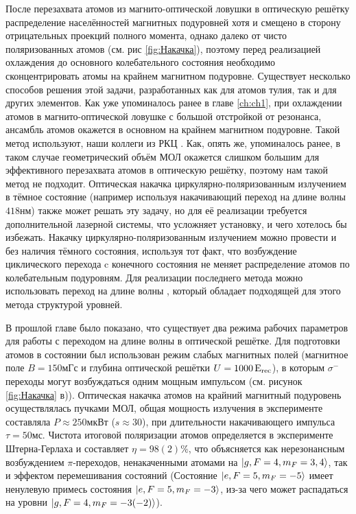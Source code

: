 После перезахвата атомов из магнито-оптической ловушки в оптическую решётку распределение населённостей магнитных подуровней хотя и смещено в сторону отрицательных проекций полного момента, однако далеко от чисто поляризованных атомов (см. рис \ref{fig:Накачка}), поэтому перед реализацией охлаждения до основного колебательного состояния необходимо сконцентрировать атомы на крайнем магнитном подуровне. 
Существует несколько способов решения этой задачи, разработанных как для атомов тулия, так и для других элементов. 
Как уже упоминалось ранее в главе \ref{ch:ch1}, при охлаждении атомов в магнито-оптической ловушке с большой отстройкой от резонанса, ансамбль атомов окажется в основном на крайнем магнитном подуровне.  
Такой метод используют, наши коллеги из РКЦ \cite{tsyganok2018polarized}. 
Как, опять же, упоминалось ранее, в таком случае геометрический объём МОЛ окажется слишком большим для эффективного перезахвата атомов в оптическую решётку, поэтому нам такой метод не подходит.
Оптическая накачка циркулярно-поляризованным излучением в тёмное состояние (например используя накачивающий переход на длине волны $418\unit{нм}$) также может решать эту задачу, но для её реализации требуется дополнительной лазерной системы, что усложняет установку, и чего хотелось бы избежать.
Накачку циркулярно-поляризованным излучением можно провести и без наличия тёмного состояния, используя тот факт, что возбуждение циклического перехода c конечного состояния не меняет распределение атомов по колебательным подуровням.
Для реализации последнего метода можно использовать переход на длине волны \thd, который обладает подходящей для этого метода структурой уровней.

В прошлой главе было показано, что существует два режима рабочих параметров для работы с переходом на длине волны \thd в оптической решётке. 
Для подготовки атомов в состоянии  был использован режим слабых магнитных полей (магнитное поле $B = 150\unit{мГс}$ и глубина оптической решётки $U = 1000\,\textrm{E}_{\text{rec}}$), в которым $\sigma^-$ переходы могут возбуждаться одним мощным импульсом (см. рисунок \ref{fig:Накачка} в)). 
Оптическая накачка атомов на крайний магнитный подуровень осуществлялась пучками МОЛ, общая мощность излучения в эксперименте составляла $P \approx 250\unit{мкВт}$ ($s\approx30$), при длительности накачивающего импульса $\tau=50\unit{мс}.$
Чистота итоговой поляризации атомов определяется в эксперименте Штерна-Герлаха и составляет $\eta = 98(2)\%$, что объясняется как нерезонансным возбуждением $\pi$-переходов, ненакаченными атомами на $\ket{g, F = 4, m_F = 3,4}$, так и эффектом перемешивания состояний (Состояние $\ket{e, F = 5, m_F=-5}$ имеет ненулевую примесь состояния $\ket{e, F = 5, m_F=-3}$, из-за чего может распадаться на уровни $\ket{g, F = 4, m_F = -3(-2)}$). 

